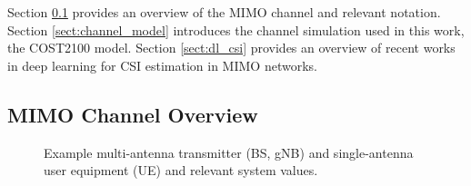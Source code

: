 
Section \ref{sect:mimo_model} provides an overview of the MIMO channel and relevant notation. Section \ref{sect:channel_model} introduces the channel simulation used in this work, the COST2100 model. Section \ref{sect:dl_csi} provides an overview of recent works in deep learning for CSI estimation in MIMO networks. 

\subsection{MIMO Channel Overview}
\label{sect:mimo_model}

\begin{figure}[!hbtp]
\centering
{
	\fontsize{6pt}{8pt}
	\def\svgwidth{0.8\columnwidth}
	
}
\caption{Example multi-antenna transmitter (BS, gNB) and single-antenna user equipment (UE) and relevant system values.}
\label{fig:mimo_schematic}
\end{figure}

